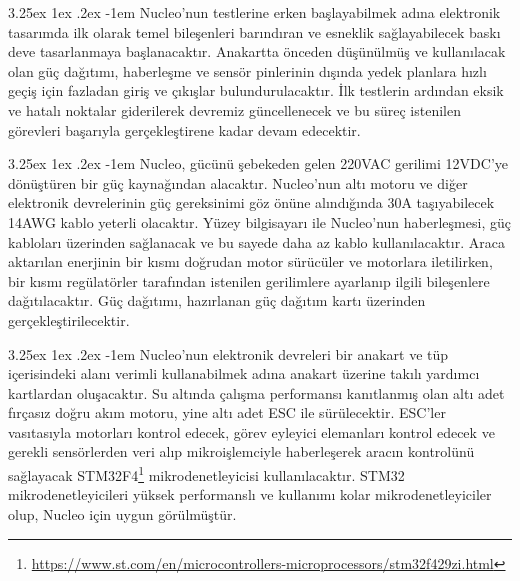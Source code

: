 \documentclass[12pt]{article}
\makeatletter
\newcounter{subsubsubsection}[subsubsection]
\renewcommand\paragraph{\@startsection{paragraph}{5}{\z@}%
  {3.25ex \@plus1ex \@minus.2ex}%
  {-1em}%
  {\normalfont\normalsize\bfseries}}
\makeatother
\begin{document}
\paragraph{} Nucleo'nun testlerine erken başlayabilmek adına elektronik tasarımda ilk olarak temel bileşenleri barındıran ve esneklik sağlayabilecek baskı deve tasarlanmaya başlanacaktır. Anakartta önceden düşünülmüş ve kullanılacak olan güç dağıtımı, haberleşme ve sensör pinlerinin dışında yedek planlara hızlı geçiş için fazladan giriş ve çıkışlar bulundurulacaktır. İlk testlerin ardından eksik ve hatalı noktalar giderilerek devremiz güncellenecek ve bu süreç istenilen görevleri başarıyla gerçekleştirene kadar devam edecektir. 


\paragraph{} Nucleo, gücünü şebekeden gelen 220VAC gerilimi 12VDC'ye dönüştüren bir güç kaynağından alacaktır. Nucleo'nun altı motoru ve diğer elektronik devrelerinin güç gereksinimi göz önüne alındığında 30A taşıyabilecek 14AWG kablo yeterli olacaktır. Yüzey bilgisayarı ile Nucleo'nun haberleşmesi, güç kabloları üzerinden sağlanacak ve bu sayede daha az kablo kullanılacaktır. Araca aktarılan enerjinin bir kısmı doğrudan motor sürücüler ve motorlara iletilirken, bir kısmı regülatörler tarafından istenilen gerilimlere ayarlanıp ilgili bileşenlere dağıtılacaktır. Güç dağıtımı, hazırlanan güç dağıtım kartı üzerinden gerçekleştirilecektir.


\paragraph{} Nucleo'nun elektronik devreleri bir anakart ve tüp içerisindeki alanı verimli kullanabilmek adına anakart üzerine takılı yardımcı kartlardan oluşacaktır. Su altında çalışma performansı kanıtlanmış olan altı adet fırçasız doğru akım motoru, yine altı adet ESC ile sürülecektir. ESC'ler vasıtasıyla motorları kontrol edecek, görev eyleyici elemanları kontrol edecek ve gerekli sensörlerden veri alıp mikroişlemciyle haberleşerek aracın kontrolünü sağlayacak STM32F4\footnote{\href{https://www.st.com/en/microcontrollers-microprocessors/stm32f429zi.html}{https://www.st.com/en/microcontrollers-microprocessors/stm32f429zi.html}} mikrodenetleyicisi kullanılacaktır. STM32 mikrodenetleyicileri yüksek performanslı ve kullanımı kolar mikrodenetleyiciler olup, Nucleo için uygun görülmüştür. 
\end{document}
